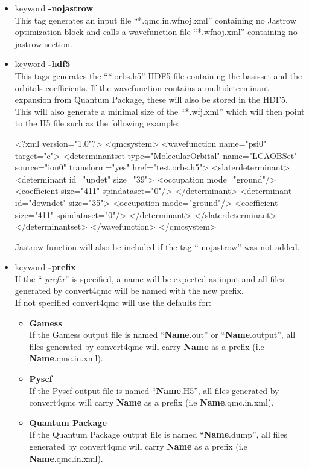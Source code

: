 \begin{itemize}
\item keyword \textbf{-nojastrow}\\
This tag generates an input file ``*.qmc.in.wfnoj.xml'' containing no Jastrow optimization block and calls a wavefunction file ``*.wfnoj.xml'' containing no jastrow section.

\item keyword \textbf{-hdf5}\\
This tags generates the ``*.orbs.h5'' HDF5 file containing the basisset and the orbitals coefficients. If the wavefunction contains a multideterminant expansion from Quantum Package, these will also be stored in the HDF5. This will also generate a minimal size of the ``*.wfj.xml'' which will then point to the H5 file such as the following example: 

\begin{shade}
 <?xml version="1.0"?>
<qmcsystem>
  <wavefunction name="psi0" target="e">
    <determinantset type="MolecularOrbital" name="LCAOBSet" source="ion0" transform="yes" href="test.orbs.h5">
      <slaterdeterminant>
        <determinant id="updet" size="39">
          <occupation mode="ground"/>
          <coefficient size="411" spindataset="0"/>
        </determinant>
        <determinant id="downdet" size="35">
          <occupation mode="ground"/>
          <coefficient size="411" spindataset="0"/>
        </determinant>
      </slaterdeterminant>
    </determinantset>
  </wavefunction>
</qmcsystem>

\end{shade}

Jastrow function will also be included if the tag ``-nojastrow'' was not added. 

\item keyword \textbf{-prefix}\\
If the ``\textit{-prefix}'' is specified, a name will be expected as input and all files generated by convert4qmc will be named with the new prefix. \\
If not specified convert4qmc will use the defaults for:\\
\begin{itemize}
 \item \textbf{Gamess}\\
If the Gamess output file  is named ``\textbf{Name}.out'' or ``\textbf{Name}.output'', all files generated by convert4qmc will carry \textbf{Name} as a prefix (i.e \textbf{Name}.qmc.in.xml).\\ 
\item \textbf{Pyscf}\\
If the Pyscf output file  is named ``\textbf{Name}.H5'', all files generated by convert4qmc will carry \textbf{Name} as a prefix (i.e \textbf{Name}.qmc.in.xml).\\ 
\item \textbf{Quantum Package}\\
If the Quantum Package output file  is named ``\textbf{Name}.dump'', all files generated by convert4qmc will carry \textbf{Name} as a prefix (i.e \textbf{Name}.qmc.in.xml).\\ 


\end{itemize}
\end{itemize}

